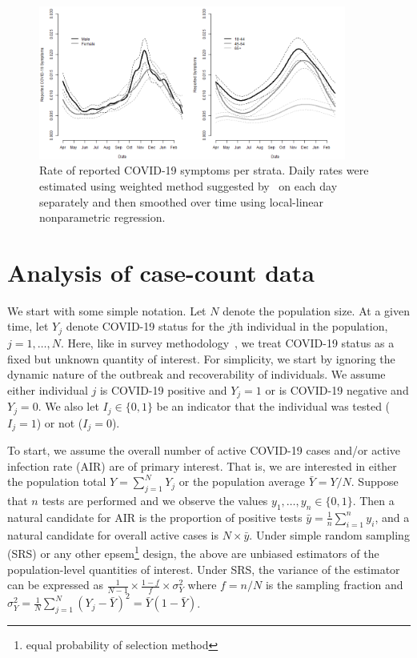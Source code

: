 \documentclass[11pt]{amsart}
\numberwithin{equation}{section}
\theoremstyle{plain}
\begin{document}
 \begin{figure}[!th]
 \centering
 \includegraphics[width = 0.9\textwidth]{../figs/fbcovid19symptoms.png}
 \caption{Rate of reported COVID-19 symptoms per strata.  Daily rates were estimated using weighted method suggested by~\citep{delphisurvey} on each day separately and then smoothed over time using local-linear nonparametric regression.}
 \label{fig:fbsymptoms}
 \vspace{-0.3cm}
 \end{figure}


 \section{Analysis of case-count data}
 \label{section:casecount}

 We start with some simple notation.  Let $N$ denote the population size.  At a given time, let $Y_j$ denote COVID-19 status for the $j$th individual in the population, $j=1,\ldots, N$. Here, like in survey methodology~\citep{Cochran77}, we treat COVID-19 status as a fixed but unknown quantity of interest. For simplicity, we start by ignoring the dynamic nature of the outbreak and recoverability of individuals. We assume either individual $j$ is COVID-19 positive and $Y_j=1$ or is COVID-19 negative and $Y_j=0$. We also let $I_j \in \{0,1\}$ be an indicator that the individual was tested ($I_j = 1$) or not ($I_j=0$).

 To start, we assume the overall number of active COVID-19 cases and/or active infection rate (AIR) are of primary interest. That is, we are interested in either the population total $Y = \sum_{j=1}^N Y_j$ or the population average $\bar Y = Y/N$. Suppose that $n$ tests are performed and we observe the values $y_1, \ldots, y_n \in \{0,1\}$.  Then a natural candidate for AIR is the proportion of positive tests $\bar y = \frac{1}{n} \sum_{i=1}^n y_i$, and a natural candidate for overall active cases is $N \times \bar y$.
 Under simple random sampling (SRS) or any other epsem\footnote{equal probability of selection method} design, the above are unbiased estimators of the population-level quantities of interest.  Under SRS, the variance of the estimator can be expressed as $\frac{1}{N-1} \times \frac{1-f}{f} \times \sigma_Y^2$ where $f = n/N$ is the sampling fraction and $\sigma_Y^2 = \frac{1}{N} \sum_{j=1}^N (Y_j - \bar Y)^2 = \bar Y (1- \bar Y)$.
\end{document}
